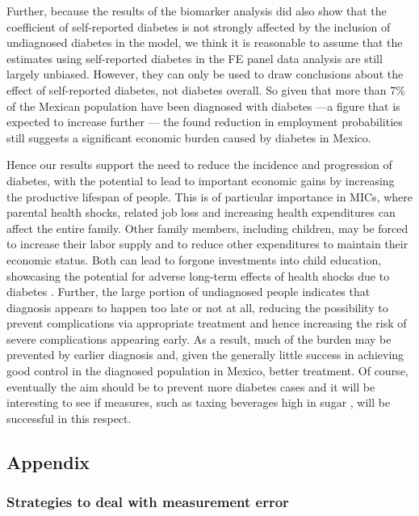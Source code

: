 \documentclass[12pt,english]{article}
\begin{document}
{Further, because the results of the biomarker analysis did also show that the coefficient of self-reported diabetes is not strongly affected by the inclusion of undiagnosed diabetes in the model, we think it is reasonable to assume that the estimates using self-reported diabetes in the \ac{FE} panel data analysis are still largely unbiased. However, they can only be used to draw conclusions about the effect of self-reported diabetes, not diabetes overall. So given that more than 7\% of the Mexican population have been diagnosed with diabetes ---a figure that is expected to increase further \parencite{Meza2015}--- the found reduction in employment probabilities still suggests a significant economic burden caused by diabetes in Mexico. 

Hence our results support the need to reduce the incidence and progression of diabetes, with the potential to lead to important economic gains by increasing the productive lifespan of people. This is of particular importance in \ac{MICs}, where parental health shocks, related job loss and increasing health expenditures can affect the entire family. Other family members, including children, may be forced to increase their labor supply and to reduce other expenditures to maintain their economic status. Both can lead to forgone investments into child education, showcasing the potential for adverse long-term effects of health shocks due to diabetes \parencite{Bratti2014}. Further, the large portion of undiagnosed people indicates that diagnosis appears to happen too late or not at all, reducing the possibility to prevent complications via appropriate treatment and hence increasing the risk of severe complications appearing early. As a result, much of the burden may be prevented by earlier diagnosis and, given the generally little success in achieving good control in the diagnosed population in Mexico, better treatment. Of course, eventually the aim should be to prevent more diabetes cases and it will be interesting to see if measures, such as taxing beverages high in sugar \parencite{}, will be successful in this respect.


\begin{appendix}
\clearpage


\part*{\label{part:Appendix}Appendix}

\section{\label{sec:Appendix}Strategies to deal with measurement error}


\end{appendix}}
\end{document}

